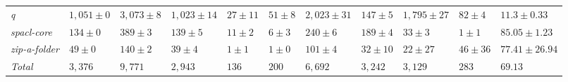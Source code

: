 \begin{table}
{\begin{tabular}[t]{lllllllllll}
\textit{q} & $1,051 \pm 0$ & $3,073 \pm 8$ & $1,023 \pm 14$ & $27 \pm 11$ & $51 \pm 8$ & $2,023 \pm 31$ & $147 \pm 5$ & $1,795 \pm 27$ & $82 \pm 4$ & $11.3 \pm 0.33$\\
\textit{spacl-core} & $134 \pm 0$ & $389 \pm 3$ & $139 \pm 5$ & $11 \pm 2$ & $6 \pm 3$ & $240 \pm 6$ & $189 \pm 4$ & $33 \pm 3$ & $1 \pm 1$ & $85.05 \pm 1.23$\\
\textit{zip-a-folder} & $49 \pm 0$ & $140 \pm 2$ & $39 \pm 4$ & $1 \pm 1$ & $1 \pm 0$ & $101 \pm 4$ & $32 \pm 10$ & $22 \pm 27$ & $46 \pm 36$ & $77.41 \pm 26.94$\\
\hline\textit{Total} & $3,376$ & $9,771$ & $2,943$ & $136$ & $200$ & $6,692$ & $3,242$ & $3,129$ & $283$ & $69.13$\\
\bottomrule
\end{tabular}}
\end{table}
